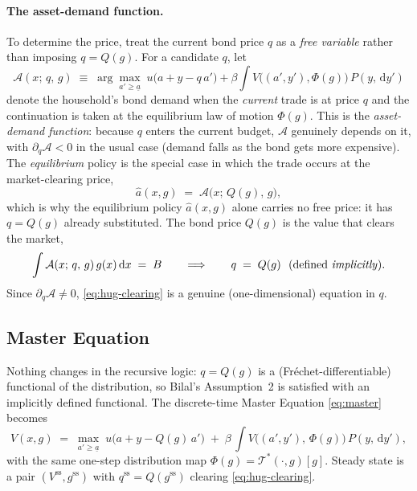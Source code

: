 \documentclass[11pt]{article}
\newcommand{\Tstar}{\mathcal{T}^{*}}
\newcommand{\gss}{g^{\mathrm{ss}}}
\newcommand{\Vss}{V^{\mathrm{ss}}}
\newcommand{\dd}{\,\mathrm{d}}
\begin{document}
\paragraph{The asset-demand function.} To determine the price, treat the current bond
price $q$ as a \emph{free variable} rather than imposing $q=Q(g)$. For a candidate $q$,
let
\begin{equation}\label{eq:hug-demand}
  \mathcal A(x;\,q,\,g)\;\equiv\;\arg\max_{a'\ge\underline a}\;
  u\big(a+y-q\,a'\big)+\beta\!\int V\big((a',y'),\Phi(g)\big)\,P(y,\dd y')
\end{equation}
denote the household's bond demand when the \emph{current} trade is at price $q$ and
the continuation is taken at the equilibrium law of motion $\Phi(g)$. This is the
\emph{asset-demand function}: because $q$ enters the current budget, $\mathcal A$
genuinely depends on it, with $\partial_q\mathcal A<0$ in the usual case (demand falls
as the bond gets more expensive). The \emph{equilibrium} policy is the special case in
which the trade occurs at the market-clearing price,
\[
  \hat a(x,g)\;=\;\mathcal A\big(x;\,Q(g),\,g\big),
\]
which is why the equilibrium policy $\hat a(x,g)$ alone carries no free price: it has
$q=Q(g)$ already substituted. The bond price $Q(g)$ is the value that clears the
market,
\begin{equation}\label{eq:hug-clearing}
  \int \mathcal A(x;\,q,\,g)\,g(x)\dd x \;=\; B
  \qquad\Longrightarrow\qquad
  q \;=\; Q(g)\ \ \text{(defined \emph{implicitly}).}
\end{equation}
Since $\partial_q\mathcal A\neq 0$, \eqref{eq:hug-clearing} is a genuine
(one-dimensional) equation in $q$.

\subsection{Master Equation}

Nothing changes in the recursive logic: $q=Q(g)$ is a (Fr\'echet-differentiable)
functional of the distribution, so Bilal's Assumption~2 is satisfied with an
implicitly defined functional. The discrete-time Master Equation \eqref{eq:master}
becomes
\begin{equation}\label{eq:hug-master}
  V(x,g) \;=\; \max_{a'\ge \underline a}\;
  u\!\big(a + y - Q(g)\,a'\big)
  \;+\; \beta\,\int V\!\big((a',y'),\,\Phi(g)\big)\,P(y,\dd y'),
\end{equation}
with the same one-step distribution map $\Phi(g)=\Tstar(\cdot,g)[g]$. Steady state is
a pair $(\Vss,\gss)$ with $q^{\mathrm{ss}}=Q(\gss)$ clearing \eqref{eq:hug-clearing}.
\end{document}

